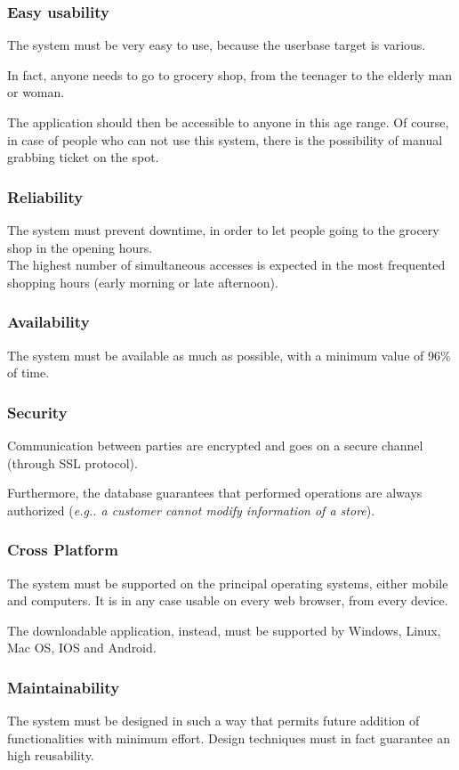\documentclass[table, 12pt]{article}
\begin{document}
\subsubsection{Easy usability}
The system must be very easy to use, because the userbase target is various.

In fact, anyone needs to go to grocery shop, from the teenager to the elderly man or woman.

The application should then be accessible to anyone in this age range. Of course, in case of people who can not use this system, there is the possibility of manual grabbing ticket on the spot.
\subsubsection{Reliability}
The system must prevent downtime, in order to let people going to the grocery shop in the opening hours. \\
The highest number of simultaneous accesses is expected in the most frequented shopping hours (early morning or late afternoon).
\subsubsection{Availability}
The system must be available as much as possible, with a minimum value of 96\% of time.
\subsubsection{Security}
Communication between parties are encrypted and goes on a secure channel (through SSL protocol).

Furthermore, the database guarantees that performed operations are always authorized (\textit{e.g.. a customer cannot modify information of a store}).
\subsubsection{Cross Platform}
The system must be supported on the principal operating systems, either mobile and computers. It is in any case usable on every web browser, from every device.

The downloadable application, instead, must be supported by Windows, Linux, Mac OS, IOS and Android.
\subsubsection{Maintainability}
The system must be designed in such a way that permits future addition of functionalities with minimum effort.
Design techniques must in fact guarantee an high reusability.
\newpage
\end{document}
